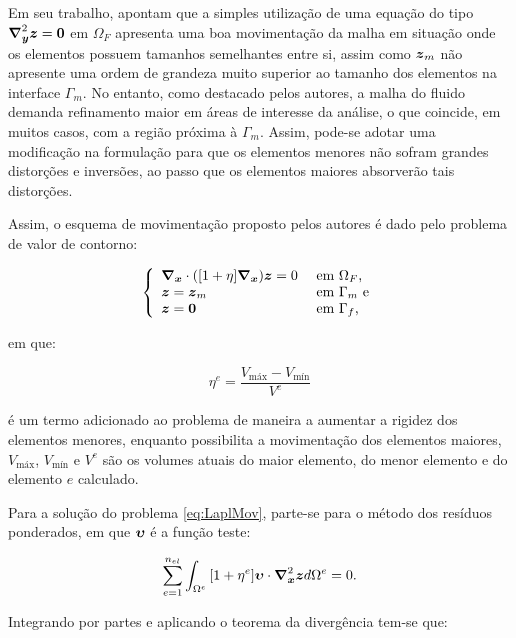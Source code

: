 Em seu trabalho,  apontam que a simples utilização de uma equação do tipo $\boldsymbol{\nabla}^2_{\boldsymbol{y}}\boldsymbol{z}=\boldsymbol{0}$ em $\Omega_F$ apresenta uma boa movimentação da malha em situação onde os elementos possuem tamanhos semelhantes entre si, assim como $\boldsymbol{z}_m$ não apresente uma ordem de grandeza muito superior ao tamanho dos elementos na interface $\Gamma_m$. No entanto, como destacado pelos autores, a malha do fluido demanda refinamento maior em áreas de interesse da análise, o que coincide, em muitos casos, com a região próxima à $\Gamma_m$. Assim, pode-se adotar uma modificação na formulação para que os elementos menores não sofram grandes distorções e inversões, ao passo que os elementos maiores absorverão tais distorções.%

Assim, o esquema de movimentação proposto pelos autores é dado pelo problema de valor de contorno:

\begin{equation}
    \left\{
    \begin{array}{ll}
        \boldsymbol{\nabla_x}\cdot([1+\eta]\boldsymbol{\nabla_x})\boldsymbol{z}=0 & \text{ em }\Omega_F\text{,}  \\
        \boldsymbol{z}=\boldsymbol{z}_m               & \text{ em }\Gamma_m\text{ e} \\
        \boldsymbol{z}=\boldsymbol{0}                 & \text{ em }\Gamma_f\text{,}
    \end{array}
    \right.\label{eq:LaplMov}
\end{equation}

\noindent em que:

\begin{equation}
    \eta^e=\frac{V_\mathrm{máx}-V_\mathrm{mín}}{V^e}
    \label{eq:movStiff}
\end{equation}

\noindent é um termo adicionado ao problema de maneira a aumentar a rigidez dos elementos menores, enquanto possibilita a movimentação dos elementos maiores, $V_\mathrm{máx}$, $V_\mathrm{mín}$ e $V^e$ são os volumes atuais do maior elemento, do menor elemento e do elemento $e$ calculado.

Para a solução do problema \eqref{eq:LaplMov}, parte-se para o método dos resíduos ponderados, em que $\boldsymbol{\upsilon}$ é a função teste:

\begin{equation}
    \sum_{e=1}^{n_{el}}{\int_{\Omega^e}{[1+\eta^e]\boldsymbol{\upsilon}\cdot\boldsymbol{\nabla}^2_{\boldsymbol{x}}\boldsymbol{z} d\Omega^e}}=0\text{.}
\end{equation}

Integrando por partes e aplicando o teorema da divergência tem-se que:


